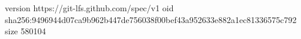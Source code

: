 version https://git-lfs.github.com/spec/v1
oid sha256:9496944d07ca9b962b447de756038f00bef43a952633e882a1ec81336575c792
size 580104

